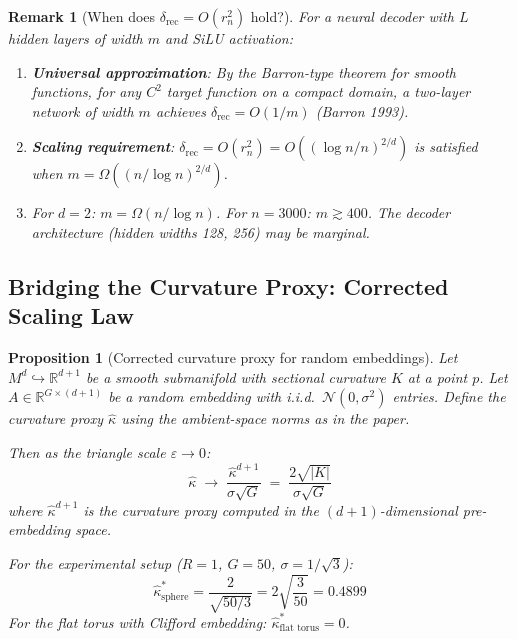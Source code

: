 \documentclass{article}
\newtheorem{proposition}{Proposition}
\newtheorem{remark}{Remark}
\newcommand{\RR}{\mathbb{R}}
\begin{document}
\begin{remark}[When does $\delta_{\mathrm{rec}} = O(r_n^2)$ hold?]
For a neural decoder with $L$ hidden layers of width $m$ and SiLU activation:
\begin{enumerate}[label=(\alph*)]
    \item \textbf{Universal approximation}: By the Barron-type theorem for
      smooth functions, for any $C^2$ target function on a compact domain,
      a two-layer network of width $m$ achieves
      $\delta_{\mathrm{rec}} = O(1/m)$ (Barron 1993).
    \item \textbf{Scaling requirement}: $\delta_{\mathrm{rec}} = O(r_n^2)
      = O((\log n / n)^{2/d})$ is satisfied when
      $m = \Omega((n/\log n)^{2/d})$.
    \item For $d = 2$: $m = \Omega(n / \log n)$. For $n = 3000$:
      $m \gtrsim 400$. The decoder architecture (hidden widths 128, 256) may
      be marginal.
\end{enumerate}
\end{remark}

\subsection{Bridging the Curvature Proxy: Corrected Scaling Law}

\begin{proposition}[Corrected curvature proxy for random embeddings]
\label{prop:kappa_corrected}
Let $M^d \hookrightarrow \RR^{d+1}$ be a smooth submanifold with sectional
curvature $K$ at a point $p$. Let $A \in \RR^{G \times (d+1)}$ be a random
embedding with i.i.d.\ $\mathcal{N}(0, \sigma^2)$ entries. Define the
curvature proxy $\hat{\kappa}$ using the ambient-space norms as in the paper.

Then as the triangle scale $\varepsilon \to 0$:
\begin{equation}\label{eq:kappa_correct}
    \hat{\kappa}
    \;\to\;
    \frac{\hat{\kappa}^{d+1}}{\sigma\sqrt{G}}
    \;=\;
    \frac{2\sqrt{|K|}}{\sigma\sqrt{G}}
\end{equation}
where $\hat{\kappa}^{d+1}$ is the curvature proxy computed in the
$(d+1)$-dimensional pre-embedding space.

For the experimental setup ($R=1$, $G=50$, $\sigma = 1/\sqrt{3}$):
\begin{equation}
    \hat{\kappa}^*_{\text{sphere}}
    = \frac{2}{\sqrt{50/3}} = 2\sqrt{\frac{3}{50}} = 0.4899
\end{equation}
For the flat torus with Clifford embedding:
$\hat{\kappa}^*_{\text{flat torus}} = 0$.
\end{proposition}
\end{document}
